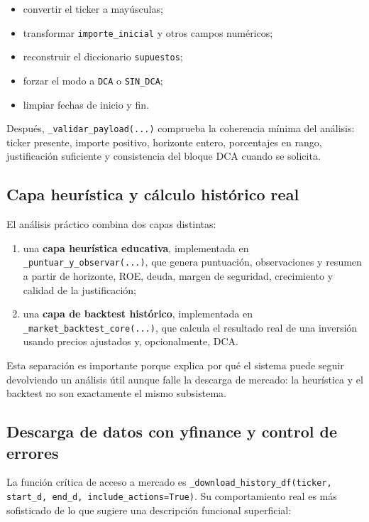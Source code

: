 \begin{itemize}
    \item convertir el ticker a mayúsculas;
    \item transformar \texttt{importe\_inicial} y otros campos numéricos;
    \item reconstruir el diccionario \texttt{supuestos};
    \item forzar el modo a \texttt{DCA} o \texttt{SIN\_DCA};
    \item limpiar fechas de inicio y fin.
\end{itemize}

Después, \texttt{\_validar\_payload(...)} comprueba la coherencia mínima del análisis: ticker presente, importe positivo, horizonte entero, porcentajes en rango, justificación suficiente y consistencia del bloque DCA cuando se solicita.

\subsection{Capa heurística y cálculo histórico real}

El análisis práctico combina dos capas distintas:

\begin{enumerate}
    \item una \textbf{capa heurística educativa}, implementada en \texttt{\_puntuar\_y\_observar(...)}, que genera puntuación, observaciones y resumen a partir de horizonte, ROE, deuda, margen de seguridad, crecimiento y calidad de la justificación;
    \item una \textbf{capa de backtest histórico}, implementada en \texttt{\_market\_backtest\_core(...)}, que calcula el resultado real de una inversión usando precios ajustados y, opcionalmente, DCA.
\end{enumerate}

Esta separación es importante porque explica por qué el sistema puede seguir devolviendo un análisis útil aunque falle la descarga de mercado: la heurística y el backtest no son exactamente el mismo subsistema.

\subsection{Descarga de datos con yfinance y control de errores}

La función crítica de acceso a mercado es \texttt{\_download\_history\_df(ticker, start\_d, end\_d, include\_actions=True)}. Su comportamiento real es más sofisticado de lo que sugiere una descripción funcional superficial:

